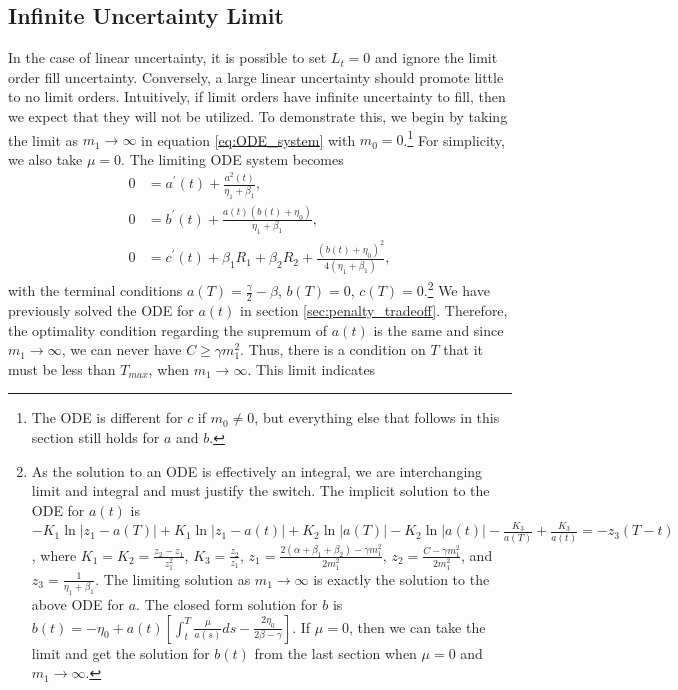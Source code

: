 \documentclass[12pt, letterpaper]{article}
\numberwithin{equation}{section}
\numberwithin{theorem}{section}
\begin{document}
\subsection{Infinite Uncertainty Limit}\label{sec:infUncertain}
 
In the case of linear uncertainty, it is possible to set $L_t=0$ and ignore the   limit order fill uncertainty. Conversely, a large linear uncertainty should promote little to no limit orders.   Intuitively, if limit orders have infinite uncertainty to fill, then we expect that they will not be utilized.  To demonstrate this, we  begin by taking the limit as $m_1\rightarrow\infty$ in equation \eqref{eq:ODE_system} with $m_0=0$.\footnote{The ODE is different for $c$ if $m_0\neq0$, but everything else that follows in this section still holds for $a$ and $b$.} For simplicity, we also take $\mu=0$. The limiting ODE system becomes
\begin{equation}
\begin{aligned}
0&=a^\prime(t)+\frac{a^2(t)}{\eta_1+\beta_1},\\
0&=b^\prime(t)+\frac{a(t)(b(t)+\eta_0)}{\eta_1+\beta_1},\\
0&=c^\prime(t)+\beta_1R_1+\beta_2R_2+\frac{(b(t)+\eta_0)^2}{4(\eta_1+\beta_1)},
\end{aligned}
\end{equation}
with the terminal conditions $a(T)=\frac{\gamma}{2}-\beta$, $b(T)=0$, $c(T)=0$.\footnote{As the solution to an ODE is effectively an integral, we are interchanging limit and integral and must justify the switch. The implicit solution to the ODE for $a(t)$ is $-K_1\ln|z_1-a(T)|+K_1\ln|z_1-a(t)|+K_2\ln|a(T)|-K_2\ln|a(t)|-\frac{K_3}{a(T)}+\frac{K_3}{a(t)}=-z_3(T-t)$, where $K_1=K_2=\frac{z_2-z_1}{z_1^2}$, $K_3=\frac{z_2}{z_1}$, $z_1=\frac{2(\alpha+\beta_1+\beta_2)-\gamma m_1^2}{2m_1^2}$, $z_2=\frac{C-\gamma m_1^2}{2m_1^2}$, and $z_3=\frac{1}{\eta_1+\beta_1}$. The limiting solution as $m_1\rightarrow\infty$ is exactly the solution to the above ODE for $a$. The closed form solution for $b$ is $b(t)=-\eta_0+a(t)\left[\int_t^T\frac{\mu}{a(s)}ds-\frac{2\eta_0}{2\beta-\gamma}\right]$. If $\mu=0$, then we can take the limit and get the solution for $b(t)$ from the last section when $\mu=0$ and $m_1\rightarrow\infty$.} We have previously solved the ODE for $a(t)$ in section \ref{sec:penalty_tradeoff}. Therefore, the optimality condition regarding the supremum of $a(t)$ is the same and since $m_1\rightarrow\infty$, we can never have $C\ge\gamma m_1^2$. Thus, there is a condition on $T$ that it must be less than $T_{max}$, when $m_1\rightarrow\infty$. This limit indicates
\end{document}
